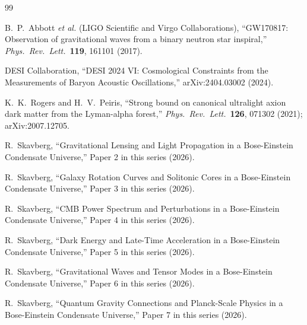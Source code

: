 \documentclass[11pt,a4paper]{article}
\theoremstyle{definition}
\theoremstyle{remark}
\begin{document}
\begin{thebibliography}{99}

B.~P.~Abbott \emph{et al.} (LIGO Scientific and Virgo Collaborations),
``GW170817: Observation of gravitational waves from a binary neutron star inspiral,''
\emph{Phys.\ Rev.\ Lett.}\ \textbf{119}, 161101 (2017).


DESI Collaboration,
``DESI 2024 VI: Cosmological Constraints from the Measurements of Baryon Acoustic Oscillations,''
arXiv:2404.03002 (2024).


K.~K.~Rogers and H.~V.~Peiris,
``Strong bound on canonical ultralight axion dark matter from the Lyman-alpha forest,''
\emph{Phys.\ Rev.\ Lett.}\ \textbf{126}, 071302 (2021);
arXiv:2007.12705.


R.~Skavberg, ``Gravitational Lensing and Light Propagation in a Bose-Einstein Condensate Universe,''
Paper 2 in this series (2026).

R.~Skavberg, ``Galaxy Rotation Curves and Solitonic Cores in a Bose-Einstein Condensate Universe,''
Paper 3 in this series (2026).

R.~Skavberg, ``CMB Power Spectrum and Perturbations in a Bose-Einstein Condensate Universe,''
Paper 4 in this series (2026).

R.~Skavberg, ``Dark Energy and Late-Time Acceleration in a Bose-Einstein Condensate Universe,''
Paper 5 in this series (2026).

R.~Skavberg, ``Gravitational Waves and Tensor Modes in a Bose-Einstein Condensate Universe,''
Paper 6 in this series (2026).

R.~Skavberg, ``Quantum Gravity Connections and Planck-Scale Physics in a Bose-Einstein Condensate Universe,''
Paper 7 in this series (2026).

\end{thebibliography}
\end{document}
